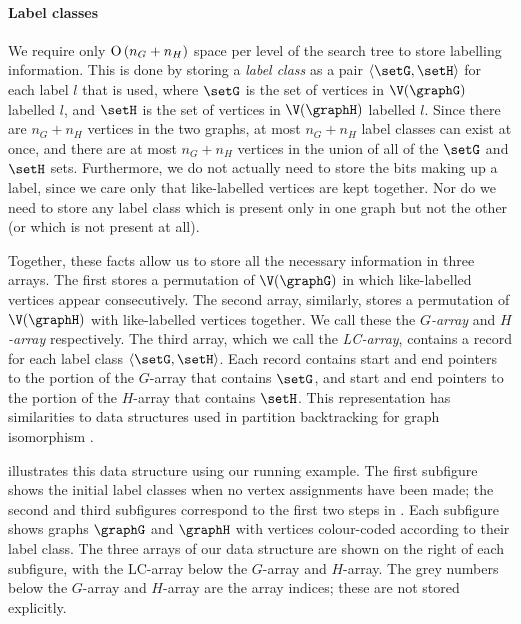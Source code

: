 \paragraph{Label classes} We require only $\operatorname{O}\left(n_G+n_H\right)$ space per level of
the search tree to store labelling information.  This is done by storing a
\emph{label class} as a pair $\langle \setG,\setH \rangle$ for each label $l$
that is used, where $\setG$ is the set of vertices in $\V(\graphG)$ labelled
$l$, and $\setH$ is the set of vertices in $\V(\graphH)$ labelled $l$. Since
there are $n_G + n_H$ vertices in the two graphs, at most $n_G + n_H$ label
classes can exist at once, and there are at most $n_G + n_H$ vertices in the
union of all of the $\setG$ and $\setH$ sets. Furthermore, we do not actually
need to store the bits making up a label, since we care only that like-labelled
vertices are kept together. Nor do we need to store any label class which is
present only in one graph but not the other (or which is not present at all).

Together, these facts allow us to store all the
necessary information in three arrays.  The first 
stores a permutation of $\V(\graphG)$ in which like-labelled vertices appear
consecutively.  The second array, similarly, stores a permutation
of $\V(\graphH)$ with like-labelled vertices together.  We call these
the \emph{$G$-array} and \emph{$H$-array} respectively. The third array,
which we call the \emph{LC-array},
contains a record for each label class $\langle \setG,\setH \rangle$.  Each
record contains start and end pointers to the portion of the
$G$-array that contains $\setG$, and start and end pointers to the portion
of the $H$-array that contains $\setH$.
This representation has
similarities to data structures used in partition backtracking for graph isomorphism
\citep{DBLP:journals/jsc/McKayP14,DBLP:conf/wea/Lopez-PresaA09}.

 illustrates this data structure using our running example.
The first subfigure shows the initial label classes when no vertex assignments have
been made; the second and third subfigures correspond to the first two steps in .
Each subfigure shows graphs $\graphG$ and $\graphH$ with vertices colour-coded according
to their label class.  The three arrays of our data structure are shown on the right of each subfigure,
with the LC-array below the $G$-array and $H$-array.  The grey numbers below the $G$-array and $H$-array
are the array indices; these are not stored explicitly.

